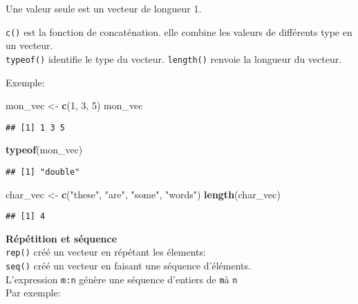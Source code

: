 \documentclass[]{book}
\newenvironment{Shaded}{\begin{snugshade}}{\end{snugshade}}
\newcommand{\DecValTok}[1]{\textcolor[rgb]{0.00,0.00,0.81}{#1}}
\newcommand{\KeywordTok}[1]{\textcolor[rgb]{0.13,0.29,0.53}{\textbf{#1}}}
\newcommand{\NormalTok}[1]{#1}
\newcommand{\StringTok}[1]{\textcolor[rgb]{0.31,0.60,0.02}{#1}}
\begin{document}
Une valeur seule est un vecteur de longueur 1.

\texttt{c()} est la fonction de concaténation. elle combine les valeurs de différents type en un vecteur.\\
\texttt{typeof()} identifie le type du vecteur. \texttt{length()} renvoie la longueur du vecteur.

Exemple:

\begin{Shaded}
\begin{Highlighting}[]
\NormalTok{mon_vec <-}\StringTok{ }\KeywordTok{c}\NormalTok{(}\DecValTok{1}\NormalTok{, }\DecValTok{3}\NormalTok{, }\DecValTok{5}\NormalTok{)}
\NormalTok{mon_vec}
\end{Highlighting}
\end{Shaded}

\begin{verbatim}
## [1] 1 3 5
\end{verbatim}

\begin{Shaded}
\begin{Highlighting}[]
\KeywordTok{typeof}\NormalTok{(mon_vec)}
\end{Highlighting}
\end{Shaded}

\begin{verbatim}
## [1] "double"
\end{verbatim}

\begin{Shaded}
\begin{Highlighting}[]
\NormalTok{char_vec <-}\StringTok{ }\KeywordTok{c}\NormalTok{(}\StringTok{"these"}\NormalTok{, }\StringTok{"are"}\NormalTok{, }\StringTok{"some"}\NormalTok{, }\StringTok{"words"}\NormalTok{)}
\KeywordTok{length}\NormalTok{(char_vec)}
\end{Highlighting}
\end{Shaded}

\begin{verbatim}
## [1] 4
\end{verbatim}

\textbf{Répétition et séquence}\\
\texttt{rep()} créé un vecteur en répétant les élements:\\
\texttt{seq()} créé un vecteur en faisant une séquence d'éléments.\\
L'expression \texttt{m:n} génère une séquence d'entiers de \texttt{m}à \texttt{n}\\
Par exemple:
\end{document}
